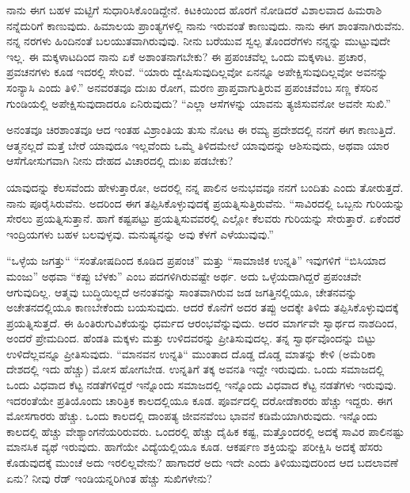 ನಾನು ಈಗ ಬಹಳ ಮಟ್ಟಿಗೆ ಸುಧಾರಿಸಿಕೊಂಡಿದ್ದೇನೆ. ಕಿಟಕಿಯಿಂದ ಹೊರಗೆ ನೋಡಿದರೆ ವಿಶಾಲವಾದ ಹಿಮರಾಶಿ ನನ್ನೆದುರಿಗೆ ಕಾಣುವುದು. ಹಿಮಾಲಯ ಪ್ರಾಂತ್ಯಗಳಲ್ಲಿ ನಾನು ಇರುವಂತೆ ಕಾಣುವುದು. ನಾನು ಈಗ ಶಾಂತನಾಗಿರುವೆನು. ನನ್ನ ನರಗಳು ಹಿಂದಿನಂತೆ ಬಲಯುತವಾಗಿರುವುವು. ನೀನು ಬರೆಯುವ ಸ್ವಲ್ಪ ತೊಂದರೆಗಳು ನನ್ನನ್ನು ಮುಟ್ಟುವುದೇ ಇಲ್ಲ. ಈ ಮಕ್ಕಳಾಟದಿಂದ ನಾನು ಏಕೆ ಅಶಾಂತನಾಗಬೇಕು? ಈ ಪ್ರಪಂಚವೆಲ್ಲ ಒಂದು ಮಕ್ಕಳಾಟ. ಪ್ರಚಾರ, ಪ್ರವಚನಗಳು ಕೂಡ ಇದರಲ್ಲಿ ಸೇರಿವೆ. “ಯಾರು ದ್ವೇಷಿಸುವುದಿಲ್ಲವೋ ಏನನ್ನೂ ಅಪೇಕ್ಷಿಸುವುದಿಲ್ಲವೋ ಅವನನ್ನು ಸಂನ್ಯಾಸಿ ಎಂದು ತಿಳಿ.” ಅನವರತವೂ ದುಃಖ ರೋಗ, ಮರಣ ಪ್ರಾಪ್ತವಾಗುತ್ತಿರುವ ಪ್ರಪಂಚವೆಂಬ ಸಣ್ಣ ಕೆಸರಿನ ಗುಂಡಿಯಲ್ಲಿ ಅಪೇಕ್ಷಿಸುವುದಾದರೂ ಏನಿರುವುದು? “ಎಲ್ಲಾ ಆಸೆಗಳನ್ನು ಯಾವನು ತ್ಯಜಿಸುವನೋ ಅವನೇ ಸುಖಿ.”

ಅನಂತವೂ ಚಿರಶಾಂತವೂ ಆದ ಇಂತಹ ವಿಶ್ರಾಂತಿಯ ತುಸು ನೋಟ ಈ ರಮ್ಯ ಪ್ರದೇಶದಲ್ಲಿ ನನಗೆ ಈಗ ಕಾಣುತ್ತಿದೆ. ಆತ್ಮನಲ್ಲದೆ ಮತ್ತೆ ಬೇರೆ ಯಾವುದೂ ಇಲ್ಲವೆಂದು ಒಮ್ಮೆ ತಿಳಿದಮೇಲೆ ಯಾವುದನ್ನು ಆಶಿಸುವುದು, ಅಥವಾ ಯಾರ ಆಸೆಗೋಸುಗವಾಗಿ ನೀನು ದೇಹದ ವಿಚಾರದಲ್ಲಿ ದುಃಖ ಪಡಬೇಕು?

\vspace{0.1cm}

ಯಾವುದನ್ನು ಕೆಲಸವೆಂದು ಹೇಳುತ್ತಾರೋ, ಅದರಲ್ಲಿ ನನ್ನ ಪಾಲಿನ ಅನುಭವವೂ ನನಗೆ ಬಂದಿತು ಎಂದು ತೋರುತ್ತದೆ. ನಾನು ಪೂರೈಸಿರುವೆನು. ಅದರಿಂದ ಈಗ ತಪ್ಪಿಸಿಕೊಳ್ಳುವುದಕ್ಕೆ ಪ್ರಯತ್ನಿಸುತ್ತಿರುವೆನು. “ಸಾವಿರದಲ್ಲಿ ಒಬ್ಬನು ಗುರಿಯನ್ನು ಸೇರಲು ಪ್ರಯತ್ನಿಸುತ್ತಾನೆ. ಹಾಗೆ ಕಷ್ಟಪಟ್ಟು ಪ್ರಯತ್ನಿಸುವವರಲ್ಲಿ ಎಲ್ಲೋ ಕೆಲವರು ಗುರಿಯನ್ನು ಸೇರುತ್ತಾರೆ. ಏಕೆಂದರೆ ಇಂದ್ರಿಯಗಳು ಬಹಳ ಬಲವುಳ್ಳವು. ಮನುಷ್ಯನನ್ನು ಅವು ಕೆಳಗೆ ಎಳೆಯುವುವು.”

“ಒಳ್ಳೆಯ ಜಗತ್ತು“ “ಸಂತೋಷದಿಂದ ಕೂಡಿದ ಪ್ರಪಂಚ” ಮತ್ತು “ಸಾಮಾಜಿಕ ಉನ್ನತಿ” ಇವುಗಳಿಗೆ “ಬಿಸಿಯಾದ ಮಂಜು” ಅಥವಾ  “ಕಪ್ಪು ಬೆಳಕು” ಎಂಬ ಪದಗಳಿಗಿರುವಷ್ಟೇ ಅರ್ಥ. ಅದು ಒಳ್ಳೆಯದಾಗಿದ್ದರೆ ಪ್ರಪಂಚವೇ ಆಗುವುದಿಲ್ಲ. ಆತ್ಮವು ಬುದ್ಧಿಯಿಲ್ಲದೆ ಅನಂತವನ್ನು ಸಾಂತವಾಗಿರುವ ಜಡ ಜಗತ್ತಿನಲ್ಲಿಯೂ, ಚೇತನವನ್ನು ಅಚೇತನದಲ್ಲಿಯೂ ಕಾಣಬೇಕೆಂದು ಬಯಸುವುದು. ಆದರೆ ಕೊನೆಗೆ ಅದರ ತಪ್ಪು ಅದಕ್ಕೇ ತಿಳಿದು ತಪ್ಪಿಸಿಕೊಳ್ಳುವುದಕ್ಕೆ ಪ್ರಯತ್ನಿಸುತ್ತದೆ. ಈ ಹಿಂತಿರುಗುವಿಕೆಯನ್ನು ಧರ್ಮದ ಆರಂಭವೆನ್ನುವುದು. ಅದರ ಮಾರ್ಗವೇ ಸ್ವಾರ್ಥದ ನಾಶದಿಂದ, ಅಂದರೆ ಪ್ರೇಮದಿಂದ. ಹೆಂಡತಿ ಮಕ್ಕಳು ಮತ್ತು ಉಳಿದವರನ್ನು ಪ್ರೀತಿಸುವುದಲ್ಲ. ತನ್ನ ಸ್ವಾರ್ಥವೊಂದನ್ನು ಬಿಟ್ಟು ಉಳಿದೆಲ್ಲವನ್ನೂ ಪ್ರೀತಿಸುವುದು. “ಮಾನವನ ಉನ್ನತಿ“ ಮುಂತಾದ ದೊಡ್ಡ ದೊಡ್ಡ ಮಾತನ್ನು ಕೇಳಿ (ಅಮೆರಿಕಾ ದೇಶದಲ್ಲಿ ಇದು ಹೆಚ್ಚು) ಮೋಸ ಹೋಗಬೇಡ. ಉನ್ನತಿಗೆ ತಕ್ಕ ಅವನತಿ ಇದ್ದೇ ಇರುವುದು. ಒಂದು ಸಮಾಜದಲ್ಲಿ ಒಂದು ವಿಧವಾದ ಕೆಟ್ಟ ನಡತೆಗಳಿದ್ದರೆ ಇನ್ನೊಂದು ಸಮಾಜದಲ್ಲಿ ಇನ್ನೊಂದು ವಿಧವಾದ ಕೆಟ್ಟ ನಡತೆಗಳು ಇರುವುವು. ಇದರಂತೆಯೇ ಪ್ರತಿಯೊಂದು ಚಾರಿತ್ರಿಕ ಕಾಲದಲ್ಲಿಯೂ ಕೂಡ. ಪೂರ್ವದಲ್ಲಿ ದರೋಡೆಕಾರರು ಹೆಚ್ಚು ಇದ್ದರು. ಈಗ ಮೋಸಗಾರರು ಹೆಚ್ಚು. ಒಂದು ಕಾಲದಲ್ಲಿ ದಾಂಪತ್ಯ ಜೀವನವೆಂಬ ಭಾವನೆ ಕಡಿಮೆಯಾಗಿರುವುದು. ಇನ್ನೊಂದು ಕಾಲದಲ್ಲಿ ಹೆಚ್ಚು ವೇಶ್ಯಾಂಗನೆಯರಿರುವರು. ಒಂದರಲ್ಲಿ ಹೆಚ್ಚು ದೈಹಿಕ ಕಷ್ಟ, ಮತ್ತೊಂದರಲ್ಲಿ ಅದಕ್ಕೆ ಸಾವಿರ ಪಾಲಿನಷ್ಟು ಮಾನಸಿಕ ವ್ಯಥೆ ಇರುವುದು. ಹಾಗೆಯೇ ವಿದ್ಯೆಯಲ್ಲಿಯೂ ಕೂಡ. ಆಕರ್ಷಣ ಶಕ್ತಿಯನ್ನು ಪರೀಕ್ಷಿಸಿ ಅದಕ್ಕೆ ಹೆಸರು ಕೊಡುವುದಕ್ಕೆ ಮುಂಚೆ ಅದು ಇರಲಿಲ್ಲವೇನು? ಹಾಗಾದರೆ ಅದು ಇದೇ ಎಂದು ತಿಳಿಯುವುದರಿಂದ ಆದ ಬದಲಾವಣೆ ಏನು? ನೀವು ರೆಡ್ ಇಂಡಿಯನ್ನರಿಗಿಂತ ಹೆಚ್ಚು ಸುಖಿಗಳೇನು?

